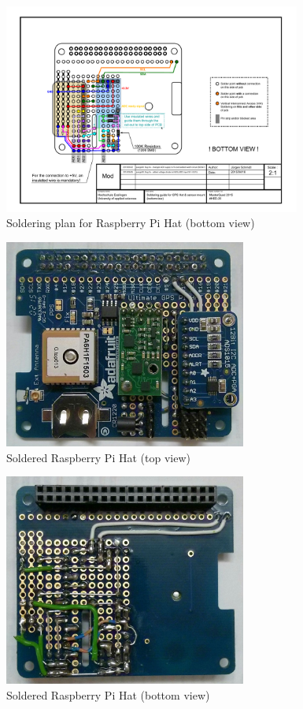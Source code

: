 \begin{figure}[H]
    \centering
    \includegraphics[width=0.87\textwidth]{fig/ch-rpi-hardware/A4_tech_draw_bottomview_gpshat_soldering}
    \caption{Soldering plan for Raspberry Pi Hat (bottom view)}
    \label{fig:hardware:soldering:bottom}
\end{figure}

\begin{figure}[H]
    \centering
    \includegraphics[width=0.71\textwidth]{fig/ch-rpi-hardware/picHatTop}
    \caption{Soldered Raspberry Pi Hat (top view)}
    \label{fig:hardware:mountedHat:top}
\end{figure}

\begin{figure}[H]
    \centering
    \includegraphics[width=0.71\textwidth]{fig/ch-rpi-hardware/picHatBottom}
    \caption{Soldered Raspberry Pi Hat (bottom view)}
    \label{fig:hardware:mountedHat:bottom}
\end{figure}

